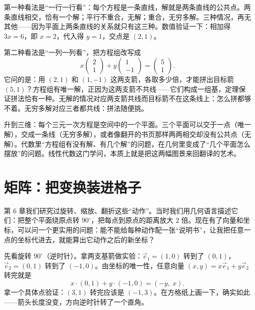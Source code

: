 第一种看法是“一行一行看”：每个方程是一条直线，解就是两条直线的公共点。两条直线相交，恰有一个解；平行不重合，无解；重合，无穷多解。三种情况，再无其他——因为平面上两条直线的关系就只有这三种。数值验证一下：相加得 $3x=6$，即 $x=2$，代入得 $y=1$，交点是 $(2,1)$。

\begin{center}
\end{center}

第二种看法是“一列一列看”，把方程组改写成
\[
x\begin{pmatrix}2\\1\end{pmatrix}+y\begin{pmatrix}1\\-1\end{pmatrix}=\begin{pmatrix}5\\1\end{pmatrix}.
\]
它问的是：用 $(2,1)$ 和 $(1,-1)$ 这两支箭，各取多少倍，才能拼出目标箭 $(5,1)$？方程组有唯一解，正因为这两支箭不共线——它们构成一组基，定理保证拼法恰有一种。无解的情况对应两支箭共线而目标箭不在这条线上：怎么拼都够不着。无穷多解对应三者都共线：拼法随便挑。

升到三维：每个三元一次方程是空间中的一个平面。三个平面可以交于一点（唯一解），交成一条线（无穷多解），或者像翻开的书页那样两两相交却没有公共点（无解）。代数里“方程组有没有解、有几个解”的问题，在几何里变成了“几个平面怎么摆放”的问题。线性代数这门学问，本质上就是把这两幅图景来回翻译的艺术。

\section{矩阵：把变换装进格子}

第 6 章我们研究过旋转、缩放、翻折这些“动作”。当时我们用几何语言描述它们：把整个平面绕原点转 $90^\circ$，把每点到原点的距离放大 $2$ 倍。现在有了向量和坐标，可以问一个更实用的问题：能不能给每种动作配一张“说明书”，让我把任意一点的坐标代进去，就能算出它动作之后的新坐标？

先看旋转 $90^\circ$（逆时针）。拿两支基箭做实验：$\vec{e}_1=(1,0)$ 转到了 $(0,1)$，$\vec{e}_2=(0,1)$ 转到了 $(-1,0)$。由坐标的唯一性，任意向量 $(x,y)=x\vec{e}_1+y\vec{e}_2$ 转完就是
\[
x\cdot(0,1)+y\cdot(-1,0)=(-y,\;x).
\]
拿一个具体点验证：$(3,1)$ 转完应该是 $(-1,3)$。在方格纸上画一下，确实如此——箭头长度没变，方向逆时针转了一个直角。

